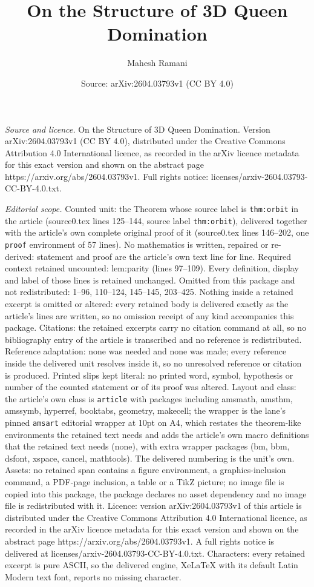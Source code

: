 \documentclass[10pt,a4paper]{amsart}
\title[On the Structure of 3D Queen Domination]{On the Structure of 3D Queen Domination}
\author{Mahesh Ramani}
\date{Source: arXiv:2604.03793v1 (CC BY 4.0)}
\begin{document}
\maketitle

\noindent\emph{Source and licence.} On the Structure of 3D Queen Domination. Version arXiv:2604.03793v1 (CC BY 4.0), distributed under the Creative Commons Attribution 4.0 International licence, as recorded in the arXiv licence metadata for this exact version and shown on the abstract page https://arxiv.org/abs/2604.03793v1. Full rights notice: licenses/arxiv-2604.03793-CC-BY-4.0.txt.\par\smallskip

\noindent\textit{Editorial scope.} Counted unit: the Theorem whose source label is \texttt{thm:orbit} in the article (source0.tex lines 125--144, source label \texttt{thm:orbit}), delivered together with the article's own complete original proof of it (source0.tex lines 146--202, one \texttt{proof} environment of 57 lines). No mathematics is written, repaired or re-derived: statement and proof are the article's own text line for line. Required context retained uncounted: lem:parity (lines 97--109). Every definition, display and label of those lines is retained unchanged. Omitted from this package and not redistributed: 1--96, 110--124, 145--145, 203--425. Nothing inside a retained excerpt is omitted or altered: every retained body is delivered exactly as the article's lines are written, so no omission receipt of any kind accompanies this package. Citations: the retained excerpts carry no citation command at all, so no bibliography entry of the article is transcribed and no reference is redistributed. Reference adaptation: none was needed and none was made; every reference inside the delivered unit resolves inside it, so no unresolved reference or citation is produced. Printed slips kept literal: no printed word, symbol, hypothesis or number of the counted statement or of its proof was altered. Layout and class: the article's own class is \texttt{article} with packages including amsmath, amsthm, amssymb, hyperref, booktabs, geometry, makecell; the wrapper is the lane's pinned \texttt{amsart} editorial wrapper at 10pt on A4, which restates the theorem-like environments the retained text needs and adds the article's own macro definitions that the retained text needs (none), with extra wrapper packages (bm, bbm, dsfont, xspace, cancel, mathtools). The delivered numbering is the unit's own. Assets: no retained span contains a figure environment, a graphics-inclusion command, a PDF-page inclusion, a table or a TikZ picture; no image file is copied into this package, the package declares no asset dependency and no image file is redistributed with it. Licence: version arXiv:2604.03793v1 of this article is distributed under the Creative Commons Attribution 4.0 International licence, as recorded in the arXiv licence metadata for this exact version and shown on the abstract page https://arxiv.org/abs/2604.03793v1. A full rights notice is delivered at licenses/arxiv-2604.03793-CC-BY-4.0.txt. Characters: every retained excerpt is pure ASCII, so the delivered engine, XeLaTeX with its default Latin Modern text font, reports no missing character.
\end{document}
